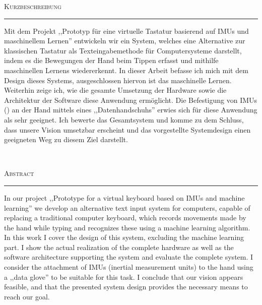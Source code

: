 \cleardoublepage
\hspace{0pt}
\vfill
\begin{center}
    \begin{minipage}{0.7\textwidth}
        \begin{center}
            \textsc{Kurzbeschreibung}
        \end{center}
        \vspace{-2ex}
        \noindent\rule[0.5ex]{\linewidth}{0.5pt}
        Mit dem Projekt ,,Prototyp für eine virtuelle Tastatur basierend auf
        IMUs und maschinellem Lernen'' entwickeln wir ein System, welches eine
        Alternative zur klassischen Tastatur als Texteingabemethode für
        Computersysteme darstellt, indem es die Bewegungen der Hand beim Tippen
        erfasst und mithilfe maschinellen Lernens wiedererkennt. In dieser
        Arbeit befasse ich mich mit dem Design dieses Systems, ausgeschlossen
        hiervon ist das maschinelle Lernen. Weiterhin zeige ich, wie die
        gesamte Umsetzung der Hardware sowie die Architektur der Software diese
        Anwendung ermöglicht. Die Befestigung von IMUs () an der Hand mittels eines ,,Datenhandschuhs'' erwies
        sich für diese Anwendung als sehr geeignet. Ich bewerte das
        Gesamtsystem und komme zu dem Schluss, dass unsere Vision umsetzbar
        erscheint und das vorgestellte Systemdesign einen geeigneten Weg zu
        diesem Ziel darstellt.
    \end{minipage}
    \\[2cm]
    \begin{minipage}{0.7\textwidth}
        \begin{center}
            \textsc{Abstract}
        \end{center}
        \vspace{-2ex}
        \noindent\rule[0.5ex]{\linewidth}{0.5pt}
        In our project ,,Prototype for a virtual keyboard based on IMUs and
        machine learning'' we develop an alternative text input system for
        computers, capable of replacing a traditional computer keyboard, which
        records movements made by the hand while typing and recognizes these
        using a machine learning algorithm. In this work I cover the design of
        this system, excluding the machine learning part. I show the actual
        realization of the complete hardware as well as the software
        architecture supporting the system and evaluate the complete system. I
        consider the attachment of IMUs (inertial measurement units) to the
        hand using a ,,data glove'' to be suitable for this task. I conclude
        that our vision appears feasible, and that the presented system design
        provides the necessary means to reach our goal.
    \end{minipage}
\end{center}
\vfill
\hspace{0pt}
\pagebreak


